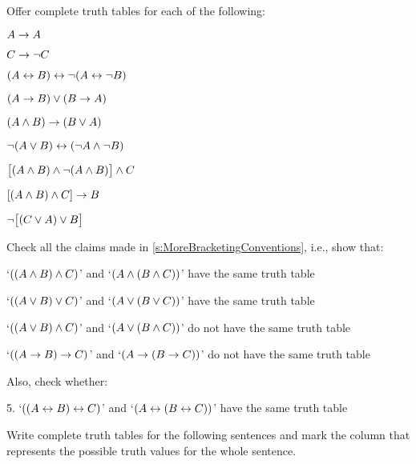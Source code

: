 \practiceproblems\label{pr.TT.TTorC}
\problempart
Offer complete truth tables for each of the following:
\begin{compactlist}
\item $A \rightarrow A$ %
\item $C \rightarrow\neg C$ %
\item $(A \leftrightarrow B) \leftrightarrow \neg(A\leftrightarrow \neg B)$ %
\item $(A \rightarrow B) \vee (B \rightarrow A)$ %
\item $(A \wedge B) \rightarrow (B \vee A)$  %
\item $\neg(A \vee B) \leftrightarrow (\neg A \wedge \neg B)$ %
\item $\bigl[(A\wedge B) \wedge\neg(A\wedge B)\bigr] \wedge C$ %
\item $[(A \wedge B) \wedge C] \rightarrow B$ %
\item $\neg\bigl[(C\vee A) \vee B\bigr]$ %
\end{compactlist}
\problempart
Check all the claims made in \cref{s:MoreBracketingConventions}, i.e., show that:
\begin{compactlist}
	\item `$((A \wedge B) \wedge C)$' and `$(A \wedge (B \wedge C))$' have the same truth table
	\item `$((A \vee B) \vee C)$' and `$(A \vee (B \vee C))$' have the same truth table
	\item `$((A \vee B) \wedge C)$' and `$(A \vee (B \wedge C))$' do not have the same truth table
	\item `$((A \rightarrow B) \rightarrow C)$' and `$(A \rightarrow (B \rightarrow C))$' do not have the same truth table
\end{compactlist}
Also, check whether:
\begin{compactlist}
	\item[5.] `$((A \leftrightarrow B) \leftrightarrow C)$' and `$(A \leftrightarrow (B \leftrightarrow C))$' have the same truth table
\end{compactlist}

\problempart
Write complete truth tables for the following sentences and mark the column that represents the possible truth values for the whole sentence.

